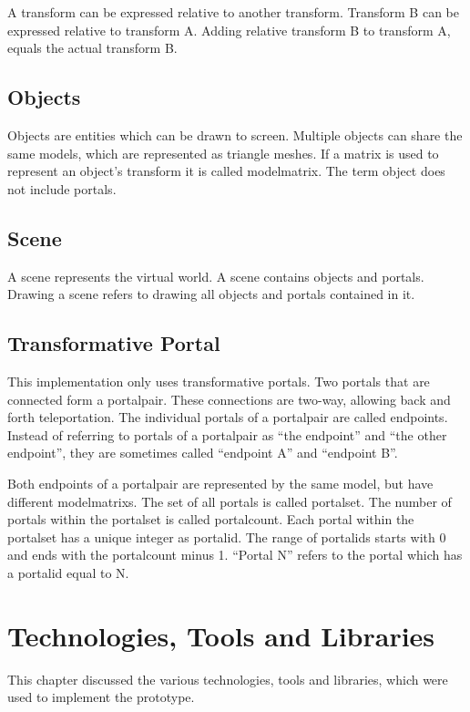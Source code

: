 A transform can be expressed relative to another transform. Transform B can be expressed relative to transform A. Adding relative transform B to transform A, equals the actual transform B.


\subsection{Objects}
Objects are entities which can be drawn to screen. Multiple objects can share the same models, which are represented as triangle meshes. If a matrix is used to represent an object's transform it is called \gls{modelmatrix}. The term object does not include portals.

\subsection{Scene}
A scene represents the virtual world. A scene contains objects and portals. Drawing a scene refers to drawing all objects and portals contained in it.



\subsection{Transformative Portal}
This implementation only uses transformative portals. Two portals that are connected form a \gls{portalpair}. These connections are two-way, allowing back and forth teleportation. The individual portals of a \gls{portalpair} are called \glspl{endpoint}. Instead of referring to portals of a \gls{portalpair} as \enquote{the \gls{endpoint}} and \enquote{the other \gls{endpoint}}, they are sometimes called \enquote{\gls{endpoint} A} and \enquote{\gls{endpoint} B}.

Both \glspl{endpoint} of a \gls{portalpair} are represented by the same model, but have different \glspl{modelmatrix}. The set of all portals is called \gls{portalset}. The number of portals within the \gls{portalset} is called \gls{portalcount}. Each portal within the \gls{portalset} has a unique integer as \gls{portalid}. The range of \glspl{portalid} starts with 0 and ends with the \gls{portalcount} minus 1. \enquote{Portal N} refers to the portal which has a \gls{portalid} equal to N.

\section{Technologies, Tools and Libraries }
This chapter discussed the various technologies, tools and libraries, which were used to implement the prototype.

